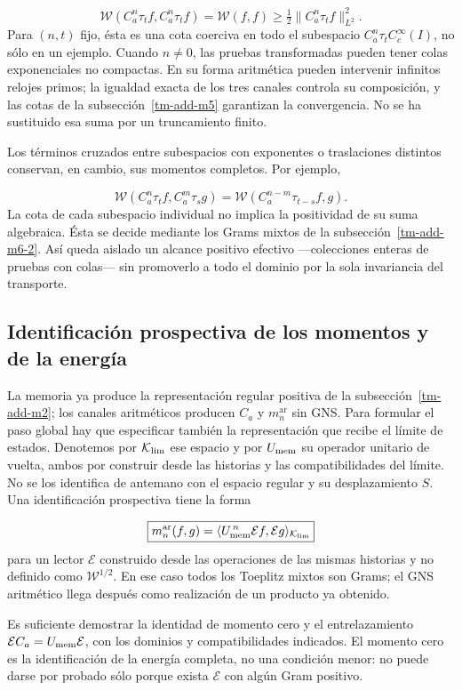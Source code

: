 \[
\boxed{\mathscr W(C_a^n\tau_t f,C_a^n\tau_t f)
=\mathscr W(f,f)
\geq\tfrac12\|C_a^n\tau_t f\|_{L^2}^2.}
\]
Para \((n,t)\) fijo, ésta es una cota coerciva en todo el subespacio \(C_a^n\tau_t C_c^\infty(I)\), no sólo en un ejemplo. Cuando \(n\ne0\), las pruebas transformadas pueden tener colas exponenciales no compactas. En su forma aritmética pueden intervenir infinitos relojes primos; la igualdad exacta de los tres canales controla su composición, y las cotas de la subsección~\ref{tm-add-m5} garantizan la convergencia. No se ha sustituido esa suma por un truncamiento finito.

Los términos cruzados entre subespacios con exponentes o traslaciones distintos conservan, en cambio, sus momentos completos. Por ejemplo,

\[
\mathscr W(C_a^n\tau_t f,C_a^m\tau_s g)
=\mathscr W(C_a^{n-m}\tau_{t-s}f,g).
\]
La cota de cada subespacio individual no implica la positividad de su suma algebraica. Ésta se decide mediante los Grams mixtos de la subsección~\ref{tm-add-m6-2}. Así queda aislado un alcance positivo efectivo —colecciones enteras de pruebas con colas— sin promoverlo a todo el dominio por la sola invariancia del transporte.


\subsection{Identificación prospectiva de los momentos y de la energía}
\label{tm-add-m7}
La memoria ya produce la representación regular positiva de la
subsección~\ref{tm-add-m2}; los canales aritméticos producen \(C_a\)
y \(m_n^{\mathrm{ar}}\) sin GNS. Para formular el paso global hay que
especificar también la representación que recibe el límite de estados.
Denotemos por \(\mathcal K_{\rm lim}\) ese espacio y por
\(U_{\rm mem}\) su operador unitario de vuelta, ambos por construir
desde las historias y las compatibilidades del límite. No se los
identifica de antemano con el espacio regular y su desplazamiento \(S\).
Una identificación prospectiva tiene la forma

\[
\boxed{m_n^{\mathrm{ar}}(f,g)
=\langle U_{\rm mem}^{\,n}\mathcal E f,\mathcal E g\rangle_{\mathcal K_{\rm lim}}}
\]
para un lector \(\mathcal E\) construido desde las operaciones de las mismas historias y no definido como \(\mathscr W^{1/2}\). En ese caso todos los Toeplitz mixtos son Grams; el GNS aritmético llega después como realización de un producto ya obtenido.

Es suficiente demostrar la identidad de momento cero y el entrelazamiento
\(\mathcal E C_a=U_{\rm mem}\mathcal E\), con los dominios y
compatibilidades indicados. El momento cero es la identificación de la
energía completa, no una condición menor: no puede darse por probado
sólo porque exista \(\mathcal E\) con algún Gram positivo.

